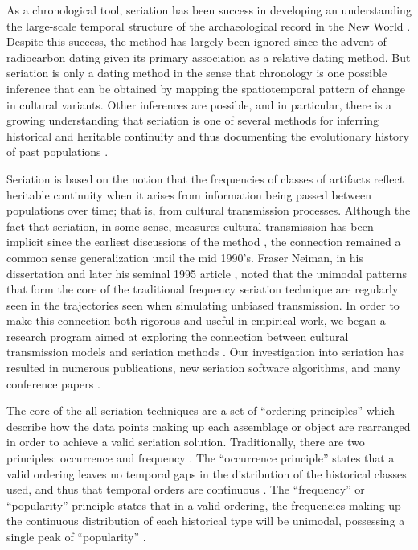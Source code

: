 As a chronological tool, seriation has been success in developing an
understanding the large-scale temporal structure of the archaeological
record in the New World
\citep{Beals1945, Bluhm1951, Evans1955, Ford1949, Kidder1917, Mayer-Oakes1955, Meggers1957, Phillips1951, Rouse1939, Smith1950}.
Despite this success, the method has largely been ignored since the
advent of radiocarbon dating given its primary association as a relative
dating method. But seriation is only a dating method in the sense that
chronology is one possible inference that can be obtained by mapping the
spatiotemporal pattern of change in cultural variants. Other inferences
are possible, and in particular, there is a growing understanding that
seriation is one of several methods for inferring historical and
heritable continuity and thus documenting the evolutionary history of
past populations
\citetext{\citealp[e.g.,][]{Lipo1997Population}; \citealp{Lipo2000}; \citealp{Lipo2001}; \citealp{Lipo2001a}; \citealp{Lipo2005}; \citealp{lipomadsen1997}; \citealp{lipomadsendunnell2015}; \citealp{Neiman1995}; \citealp[Ch.
3]{OBrien1999b}; \citealp{Teltser1995}}.

Seriation is based on the notion that the frequencies of classes of
artifacts reflect heritable continuity when it arises from information
being passed between populations over time; that is, from cultural
transmission processes. Although the fact that seriation, in some sense,
measures cultural transmission has been implicit since the earliest
discussions of the method \citep[e.g.,][]{Kroeber1923}, the connection
remained a common sense generalization until the mid 1990's. Fraser
Neiman, in his dissertation \citep{Neiman1990} and later his seminal
1995 article \citep{Neiman1995}, noted that the unimodal patterns that
form the core of the traditional frequency seriation technique are
regularly seen in the trajectories seen when simulating unbiased
transmission. In order to make this connection both rigorous and useful
in empirical work, we began a research program aimed at exploring the
connection between cultural transmission models and seriation methods
\citep{Lipo1997Population}. Our investigation into seriation has
resulted in numerous publications, new seriation software algorithms,
and many conference papers
\citep{Lipo2008, Lipo2001neutrality, Lipo2001a, Lipo2005, lipomadsen1997, lipomadsendunnell2015, Madsen2014, madsenlipo2015b, Madsen2008, o2015design}.

The core of the all seriation techniques are a set of ``ordering
principles'' which describe how the data points making up each
assemblage or object are rearranged in order to achieve a valid
seriation solution. Traditionally, there are two principles: occurrence
and frequency \citep{Dunnell:1970aa, Rouse1967, Whitlam:1981vs}. The
``occurrence principle'' states that a valid ordering leaves no temporal
gaps in the distribution of the historical classes used, and thus that
temporal orders are continuous
\citep{dempsey1963statistical, rowe1959archaeological}. The
``frequency'' or ``popularity'' principle states that in a valid
ordering, the frequencies making up the continuous distribution of each
historical type will be unimodal, possessing a single peak of
``popularity'' \citep{Nelson1916}.

